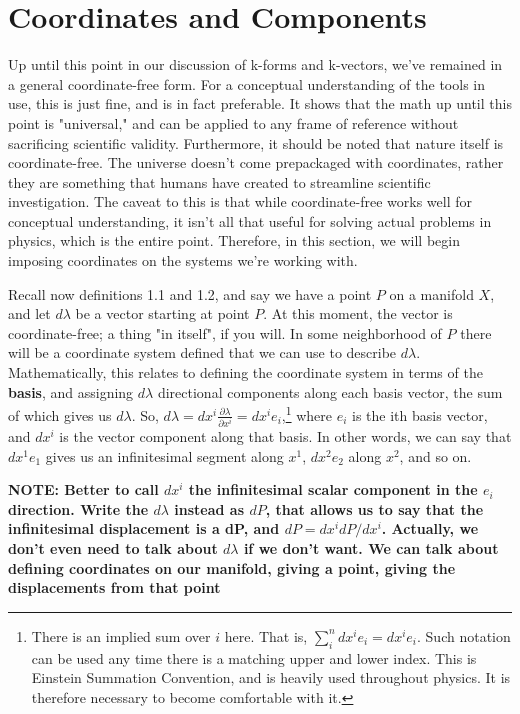 \documentclass{book}
\begin{document}
\section{Coordinates and Components} 





Up until this point in our discussion of k-forms and k-vectors, we've remained in a general coordinate-free form. For a conceptual understanding of the tools in use, this is just fine, and is in fact preferable. It shows that the math up until this point is "universal," and can be applied to any frame of reference without sacrificing scientific validity. Furthermore, it should be noted that nature itself is coordinate-free. The universe doesn't come prepackaged with coordinates, rather they are something that humans have created to streamline scientific investigation. The caveat to this is that while coordinate-free works well for conceptual understanding, it isn't all that useful for solving actual problems in physics, which is the entire point. Therefore, in this section, we will begin imposing coordinates on the systems we're working with. 


Recall now definitions 1.1 and 1.2, and say we have a point $P$ on a manifold $X$, and let $d\lambda$ be a vector starting at point $P$. At this moment, the vector is coordinate-free; a thing "in itself", if you will. In some neighborhood of $P$ there will be a coordinate system defined that we can use to describe $d\lambda$. Mathematically, this relates to defining the coordinate system in terms of the \textbf{basis}, and assigning $d\lambda$ directional components  along each basis vector, the sum of which gives us $d\lambda$. So, $d\lambda = dx^i \frac{\partial \lambda}{\partial x^i} = dx^i e_i$,\footnote{There is an implied sum over $i$ here. That is, $\sum_i^n dx^i e_i = dx^i e_i$. Such notation can be used any time there is a matching upper and lower index. This is Einstein Summation Convention, and is heavily used throughout physics. It is therefore necessary to become comfortable with it.} where $e_i$ is the ith basis vector, and $dx^i$ is the vector component along that basis. In other words, we can say that $dx^1e_1$ gives us an infinitesimal segment along $x^1$, $dx^2e_2$ along $x^2$, and so on. 

\textbf{NOTE: Better to call $dx^i$ the infinitesimal scalar component in the $e_i$ direction. Write the $d\lambda$ instead as $dP$, that allows us to say that the infinitesimal displacement is a dP, and $dP = dx^i dP/dx^i$. Actually, we don't even need to talk about $d\lambda$ if we don't want. We can talk about defining coordinates on our manifold, giving a point, giving the displacements from that point}
\end{document}
